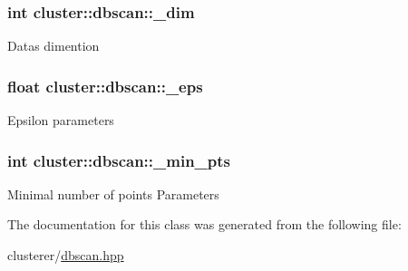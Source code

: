 \subsubsection[{\+\_\+dim}]{\setlength{\rightskip}{0pt plus 5cm}int cluster\+::dbscan\+::\+\_\+dim\hspace{0.3cm}{\ttfamily [protected]}}\label{classcluster_1_1dbscan_af11131046370eccd7ff4538f328106bb}
Data\textquotesingle{}s dimention \hypertarget{classcluster_1_1dbscan_a623eaf58c70c4b8af054d421addb33af}{}
\subsubsection[{\+\_\+eps}]{\setlength{\rightskip}{0pt plus 5cm}float cluster\+::dbscan\+::\+\_\+eps\hspace{0.3cm}{\ttfamily [protected]}}\label{classcluster_1_1dbscan_a623eaf58c70c4b8af054d421addb33af}
Epsilon parameters \hypertarget{classcluster_1_1dbscan_aaf6a0241678a63592356ab8e150ee511}{}
\subsubsection[{\+\_\+min\+\_\+pts}]{\setlength{\rightskip}{0pt plus 5cm}int cluster\+::dbscan\+::\+\_\+min\+\_\+pts\hspace{0.3cm}{\ttfamily [protected]}}\label{classcluster_1_1dbscan_aaf6a0241678a63592356ab8e150ee511}
Minimal number of points Parameters 

The documentation for this class was generated from the following file\+:\begin{DoxyCompactItemize}
\item 
clusterer/\hyperlink{dbscan_8hpp}{dbscan.\+hpp}\end{DoxyCompactItemize}

